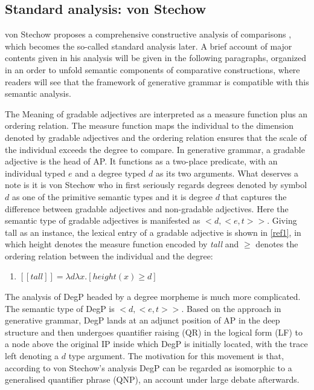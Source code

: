 \documentclass{ctexart}
\let \cite \parencite
\begin{document}
\subsection{Standard analysis: von Stechow}

\noindent
von Stechow proposes a comprehensive constructive analysis of comparisons \cite{von1984a}, which becomes the so-called standard analysis later\cite{bale2011}. A brief account of major contents given in his analysis will be given in the following paragraphs, organized in an order to unfold semantic components of comparative constructions, where readers will see that the framework of generative grammar is compatible with this semantic analysis.

The Meaning of gradable adjectives are interpreted as a measure function plus an ordering relation. The measure function maps the individual to the dimension denoted by gradable adjectives and the ordering relation ensures that the scale of the individual exceeds the degree to compare. In generative grammar, a gradable adjective is the head of AP. It functions as a two-place predicate, with an individual typed $e$ and a degree typed $d$ as its two arguments. What deserves a note is it is von Stechow who in first seriously regards degrees denoted by symbol $d$ as one of the primitive semantic types and it is degree $d$ that captures the difference between gradable adjectives and non-gradable adjectives. Here the semantic type of gradable adjectives is manifested as $<d,<e,t>>$. Giving tall as an instance, the lexical entry of a gradable adjective is shown in \ref{ref1}, in which height denotes the measure function encoded by \textit{tall} and $\geq$ denotes the ordering relation between the individual and the degree:

\begin{enumerate}
\item \label{ref1} $[\![tall]\!] = \lambda d \lambda x. [height(x) \geq d]$
\end{enumerate}

The analysis of DegP headed by a degree morpheme is much more complicated. The semantic type of DegP is $<d,<e,t>>$. Based on the approach in generative grammar, DegP lands at an adjunct position of AP in the deep structure and then undergoes quantifier raising (QR) in the logical form (LF) to a node above the original IP inside which DegP is initially located, with the trace left denoting a $d$ type argument. The motivation for this movement is that, according to von Stechow’s analysis DegP can be regarded as isomorphic to a generalised quantifier phrase (QNP), an account under large debate afterwards.
\end{document}
